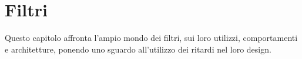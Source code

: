 
\chapter{Filtri}
\label{chp:Filtri}

Questo capitolo affronta l'ampio mondo dei filtri, sui loro utilizzi, comportamenti e architetture, ponendo uno sguardo all'utilizzo dei ritardi nel loro design.